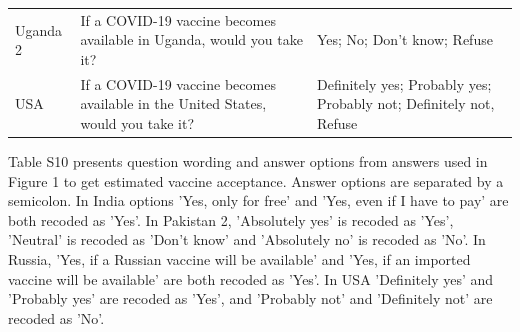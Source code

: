 \documentclass[
  12pt,
]{article}
\begin{document}
\begin{table}[!h]
{\begin{threeparttable}
\begin{tabular}[t]{>{\raggedright\arraybackslash}p{8em}>{\raggedright\arraybackslash}p{30em}>{\raggedright\arraybackslash}p{20em}}
Uganda 2 & If a COVID-19 vaccine becomes available in Uganda, would you take it? & Yes; No; Don't know; Refuse\\
USA & If a COVID-19 vaccine becomes available in the United States, would you take it? & Definitely yes; Probably yes; Probably not; Definitely not, Refuse\\
\bottomrule
\end{tabular}
\begin{tablenotes}
\item Table S10 presents question wording and answer options from answers used in Figure 1 to get estimated vaccine acceptance. Answer options are separated by a semicolon. In India options 'Yes, only for free' and 'Yes, even if I have to pay' are both recoded as 'Yes'. In Pakistan 2, 'Absolutely yes' is recoded as 'Yes', 'Neutral' is recoded as 'Don't know' and 'Absolutely no' is recoded as 'No'. In Russia, 'Yes, if a Russian vaccine will be available' and 'Yes, if an imported vaccine will be available' are both recoded as 'Yes'. In USA 'Definitely yes' and 'Probably yes' are recoded as 'Yes', and 'Probably not' and 'Definitely not' are recoded as 'No'.
\end{tablenotes}
\end{threeparttable}}
\end{table}
\end{document}
